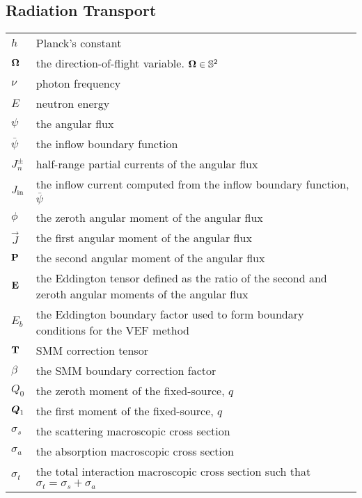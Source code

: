 \documentclass[../doc.tex]{subfiles}
\begin{document}
\subsection*{Radiation Transport}
\begin{longtable}{p{2cm}p{12cm}}
$h$ & Planck's constant \\
$\Omegahat$ & the direction-of-flight variable. $\Omegahat\in \mathbb{S}^2$\\
$\nu$ & photon frequency \\
$E$ & neutron energy \\
$\psi$ & the angular flux \\
$\bar{\psi}$ & the inflow boundary function \\
$J_n^\pm$ & half-range partial currents of the angular flux \\
$\Jin$ & the inflow current computed from the inflow boundary function, $\bar{\psi}$ \\
$\phi$ & the zeroth angular moment of the angular flux \\
$\vec{J}$ & the first angular moment of the angular flux \\
$\P$ & the second angular moment of the angular flux \\
$\E$ & the Eddington tensor defined as the ratio of the second and zeroth angular moments of the angular flux \\
$E_b$ & the Eddington boundary factor used to form boundary conditions for the VEF method \\
$\T$ & SMM correction tensor \\
$\beta$ & the SMM boundary correction factor \\
$Q_0$ & the zeroth moment of the fixed-source, $q$ \\
$\Qone$ & the first moment of the fixed-source, $q$ \\
$\sigma_s$ & the scattering macroscopic cross section \\
$\sigma_a$ & the absorption macroscopic cross section \\
$\sigma_t$ & the total interaction macroscopic cross section such that $\sigma_t = \sigma_s + \sigma_a$ \\ 
\end{longtable}
\end{document}
